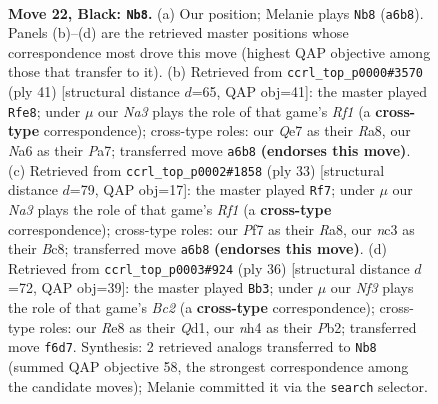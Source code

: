 \documentclass[11pt]{article}
\begin{document}
\clearpage

\begin{figure}[p]\centering
\begin{subfigure}{0.46\textwidth}\centering
\resizebox{\linewidth}{!}{%
\newchessgame
\chessboard[
  setfen={4r1k1/r3qpp1/np1p1n2/4p2p/P1B1P1bN/2N3P1/R1PQ1P1P/2R3K1 b - - 6 22},
  showmover=false,
  pgfstyle=straightmove, color=movearrow, markmove={a6-b8}
]}
\caption{}
\end{subfigure}\hfill
\begin{subfigure}{0.46\textwidth}\centering
\resizebox{\linewidth}{!}{%
\newchessgame
\chessboard[
  setfen={r4r2/ppbq2pk/2n2npp/2Bp4/P7/2P2N1P/1PQN1PP1/R3R1K1 b - - 3 21},
  showmover=false,
  pgfstyle=straightmove, color=movearrow, markmove={f8-e8}
]}
\caption{}
\end{subfigure}
\\[4pt]
\begin{subfigure}{0.46\textwidth}\centering
\resizebox{\linewidth}{!}{%
\newchessgame
\chessboard[
  setfen={r1bq1rk1/p1p3b1/1p1p1nNp/3Pp3/2P5/2N2QP1/PP1B1P1P/R4RK1 b - - 0 17},
  showmover=false,
  pgfstyle=straightmove, color=movearrow, markmove={f8-f7}
]}
\caption{}
\end{subfigure}\hfill
\begin{subfigure}{0.46\textwidth}\centering
\resizebox{\linewidth}{!}{%
\newchessgame
\chessboard[
  setfen={r3r1k1/2pq1pp1/2n4p/pp1bp3/8/2PPRN1P/PPB2PP1/R2Q2K1 w - - 0 19},
  showmover=false,
  pgfstyle=straightmove, color=movearrow, markmove={c2-b3}
]}
\caption{}
\end{subfigure}
\caption{\textbf{Move 22, Black: \texttt{Nb8}.} (a) Our position; Melanie plays \texttt{Nb8} (\texttt{a6b8}). Panels (b)--(d) are the retrieved master positions whose correspondence most drove this move (highest QAP objective among those that transfer to it). (b) Retrieved from \texttt{ccrl\_top\_p0000\#3570} (ply 41) [structural distance $d$=65, QAP obj=41]: the master played \texttt{Rfe8}; under $\mu$ our \emph{Na3} plays the role of that game's \emph{Rf1} (a \textbf{cross-type} correspondence); cross-type roles: our \emph{Q}e7 as their \emph{R}a8, our \emph{N}a6 as their \emph{P}a7; transferred move \texttt{a6b8} \textbf{(endorses this move)}. (c) Retrieved from \texttt{ccrl\_top\_p0002\#1858} (ply 33) [structural distance $d$=79, QAP obj=17]: the master played \texttt{Rf7}; under $\mu$ our \emph{Na3} plays the role of that game's \emph{Rf1} (a \textbf{cross-type} correspondence); cross-type roles: our \emph{P}f7 as their \emph{R}a8, our \emph{n}c3 as their \emph{B}c8; transferred move \texttt{a6b8} \textbf{(endorses this move)}. (d) Retrieved from \texttt{ccrl\_top\_p0003\#924} (ply 36) [structural distance $d$=72, QAP obj=39]: the master played \texttt{Bb3}; under $\mu$ our \emph{Nf3} plays the role of that game's \emph{Bc2} (a \textbf{cross-type} correspondence); cross-type roles: our \emph{R}e8 as their \emph{Q}d1, our \emph{n}h4 as their \emph{P}b2; transferred move \texttt{f6d7}. Synthesis: 2 retrieved analogs transferred to \texttt{Nb8} (summed QAP objective 58, the strongest correspondence among the candidate moves); Melanie committed it via the \texttt{search} selector.}
\label{fig:thought-m43}
\end{figure}
\end{document}
